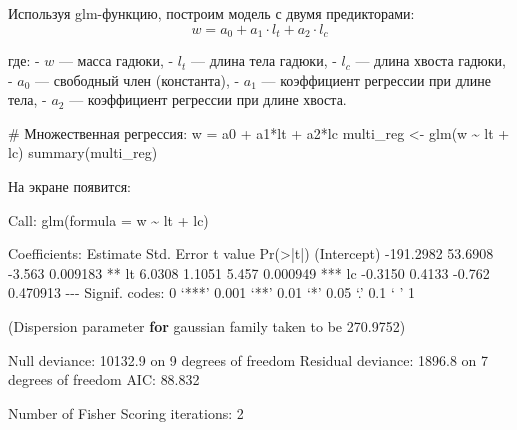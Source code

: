 \documentclass[
  letterpaper,
  DIV=11,
  numbers=noendperiod]{scrreprt}
\newenvironment{Shaded}{\begin{snugshade}}{\end{snugshade}}
\newcommand{\AttributeTok}[1]{\textcolor[rgb]{0.40,0.45,0.13}{#1}}
\newcommand{\CommentTok}[1]{\textcolor[rgb]{0.37,0.37,0.37}{#1}}
\newcommand{\ControlFlowTok}[1]{\textcolor[rgb]{0.00,0.23,0.31}{\textbf{#1}}}
\newcommand{\DecValTok}[1]{\textcolor[rgb]{0.68,0.00,0.00}{#1}}
\newcommand{\ErrorTok}[1]{\textcolor[rgb]{0.68,0.00,0.00}{#1}}
\newcommand{\FloatTok}[1]{\textcolor[rgb]{0.68,0.00,0.00}{#1}}
\newcommand{\FunctionTok}[1]{\textcolor[rgb]{0.28,0.35,0.67}{#1}}
\newcommand{\NormalTok}[1]{\textcolor[rgb]{0.00,0.23,0.31}{#1}}
\newcommand{\OtherTok}[1]{\textcolor[rgb]{0.00,0.23,0.31}{#1}}
\newcommand{\SpecialCharTok}[1]{\textcolor[rgb]{0.37,0.37,0.37}{#1}}
\begin{document}
Используя glm-функцию, построим модель с двумя предикторами: \[
w = a_0 + a_1 \cdot l_t + a_2 \cdot l_c
\]

где: - \(w\) --- масса гадюки, - \(l_t\) --- длина тела гадюки, -
\(l_c\) --- длина хвоста гадюки, - \(a_0\) --- свободный член
(константа), - \(a_1\) --- коэффициент регрессии при длине тела, -
\(a_2\) --- коэффициент регрессии при длине хвоста.

\begin{Shaded}
\begin{Highlighting}[]
\CommentTok{\# Множественная регрессия: w = a0 + a1*lt + a2*lc}
\NormalTok{multi\_reg }\OtherTok{\textless{}{-}} \FunctionTok{glm}\NormalTok{(w }\SpecialCharTok{\textasciitilde{}}\NormalTok{ lt }\SpecialCharTok{+}\NormalTok{ lc)}
\FunctionTok{summary}\NormalTok{(multi\_reg)}
\end{Highlighting}
\end{Shaded}

На экране появится:

\begin{Shaded}
\begin{Highlighting}[]
\NormalTok{Call}\SpecialCharTok{:}
\FunctionTok{glm}\NormalTok{(}\AttributeTok{formula =}\NormalTok{ w }\SpecialCharTok{\textasciitilde{}}\NormalTok{ lt }\SpecialCharTok{+}\NormalTok{ lc)}

\NormalTok{Coefficients}\SpecialCharTok{:}
\NormalTok{             Estimate Std. Error t value }\FunctionTok{Pr}\NormalTok{(}\SpecialCharTok{\textgreater{}}\ErrorTok{|}\NormalTok{t}\SpecialCharTok{|}\NormalTok{)    }
\NormalTok{(Intercept) }\SpecialCharTok{{-}}\FloatTok{191.2982}    \FloatTok{53.6908}  \SpecialCharTok{{-}}\FloatTok{3.563} \FloatTok{0.009183} \SpecialCharTok{**} 
\NormalTok{lt             }\FloatTok{6.0308}     \FloatTok{1.1051}   \FloatTok{5.457} \FloatTok{0.000949} \SpecialCharTok{**}\ErrorTok{*}
\NormalTok{lc            }\SpecialCharTok{{-}}\FloatTok{0.3150}     \FloatTok{0.4133}  \SpecialCharTok{{-}}\FloatTok{0.762} \FloatTok{0.470913}    
\SpecialCharTok{{-}{-}{-}}
\NormalTok{Signif. codes}\SpecialCharTok{:}  \DecValTok{0}\NormalTok{ ‘}\SpecialCharTok{**}\ErrorTok{*}\NormalTok{’ }\FloatTok{0.001}\NormalTok{ ‘}\SpecialCharTok{**}\NormalTok{’ }\FloatTok{0.01}\NormalTok{ ‘}\SpecialCharTok{*}\NormalTok{’ }\FloatTok{0.05}\NormalTok{ ‘.’ }\FloatTok{0.1}\NormalTok{ ‘ ’ }\DecValTok{1}

\NormalTok{(Dispersion parameter }\ControlFlowTok{for}\NormalTok{ gaussian family taken to be }\FloatTok{270.9752}\NormalTok{)}

\NormalTok{    Null deviance}\SpecialCharTok{:} \FloatTok{10132.9}\NormalTok{  on }\DecValTok{9}\NormalTok{  degrees of freedom}
\NormalTok{Residual deviance}\SpecialCharTok{:}  \FloatTok{1896.8}\NormalTok{  on }\DecValTok{7}\NormalTok{  degrees of freedom}
\NormalTok{AIC}\SpecialCharTok{:} \FloatTok{88.832}

\NormalTok{Number of Fisher Scoring iterations}\SpecialCharTok{:} \DecValTok{2}
\end{Highlighting}
\end{Shaded}
\end{document}
